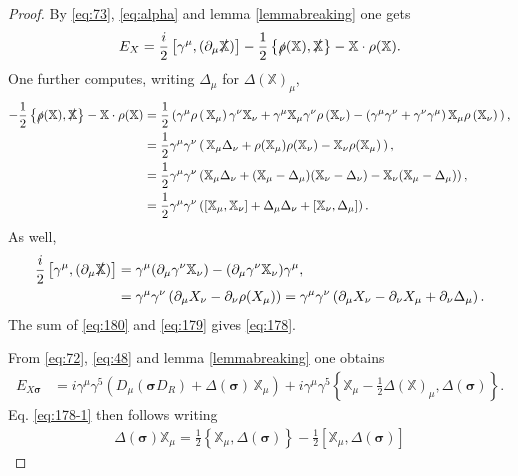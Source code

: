 \documentclass[11pt]{article}
\newcommand{\sig}{{\boldsymbol{\sigma}}}
\newcommand{\XX}{{\mathbb X}}
\newcommand{\del}{\partial}
\begin{document}
\begin{proof}
By \eqref{eq:73}, \eqref{eq:alpha} and lemma \ref{lemmabreaking} one gets
\begin{equation}
  \label{eq:169}
  E_X =\frac i2\left[\gamma^\mu, (\del_\mu \slashed \XX)\right]  - 
    \frac 12 \left\{\slashed \rho(\XX), \slashed \XX\right\} - \XX\cdot \rho(\XX).
\end{equation}
One further computes, writing $\Delta_\mu$ for $\Delta(\XX)_\mu$,
\begin{align}
\nonumber
   -\frac 12 \left\{\slashed \rho(\XX), \slashed \XX\right\}- \XX\cdot
   \rho(\XX) &= \frac 12\left(\gamma^\mu\rho\left(\,\XX_\mu \right)\gamma^\nu \XX_\nu + \gamma^\mu \XX_\mu
   \gamma^\nu\rho\left(\XX_\nu \right) - \left(\gamma^\mu\gamma^\nu +
   \gamma^\nu\gamma^\mu \right) \XX_\mu\rho\left(\XX_\nu \right)\,\right),\\
\nonumber &=  \frac 12\gamma^\mu\gamma^\nu\left(\,\XX_\mu \Delta_\nu +
  \rho(\XX_\mu)\rho(\XX_\nu)  - \XX_\nu\rho(\XX_\mu)\, \right),\\
\nonumber &=  \frac 12\gamma^\mu\gamma^\nu\left(\XX_\mu \Delta_\nu +
  (\XX_\mu - \Delta_\mu)(\XX_\nu -\Delta_\nu)  - \XX_\nu(\XX_\mu-\Delta_\mu)
\right),\\
\label{eq:179}&=  \frac 12\gamma^\mu\gamma^\nu\left([\XX_\mu, \XX_\nu] +
  \Delta_\mu\Delta_\nu  + [\XX_\nu,\Delta_\mu]
\right).
\end{align}
As well,
\begin{align}
\nonumber
  \frac i2 \left[\gamma^\mu, (\del_\mu \slashed \XX)\right]  &= \gamma^\mu (\del_\mu \gamma^\nu
   \XX_\nu) - (\del_\mu \gamma^\nu \XX_\nu) \gamma^\mu,\\ 
\label{eq:180}
&=
   \gamma^\mu\gamma^\nu\left( \del_\mu X_\nu - \del_\nu
     \rho(X_\mu)\right)=   \gamma^\mu\gamma^\nu\left( \del_\mu X_\nu -  \del_\nu X_\mu +
  \del_\nu \Delta_\mu\right).
  \end{align} 
The sum of \eqref{eq:180} and \eqref{eq:179} gives \eqref{eq:178}.
\smallskip

From \eqref{eq:72}, \eqref{eq:48} and
lemma \ref{lemmabreaking} one obtains
\begin{align}
  \label{eq:42}
  E_{X\sig} &= i\gamma^\mu\gamma^5\left(D_\mu (\sig D_R) +
    \Delta(\sig)\,\XX_\mu\right) + i\gamma^\mu
  \gamma^5\left\{\XX_\mu  -\frac 12\Delta(\XX)_\mu, \Delta(\sig) 
  \right\}.
\end{align}
Eq. \eqref{eq:178-1} then follows writing 
\begin{align}
  \label{eq:33}
   \Delta(\sig) \XX_\mu = \frac 12\left\{ \XX_\mu , \Delta(\sig)\right\} -\frac12 \left[
     \XX_\mu, \Delta(\sig) \right]
\end{align}


\end{proof}
\end{document}
